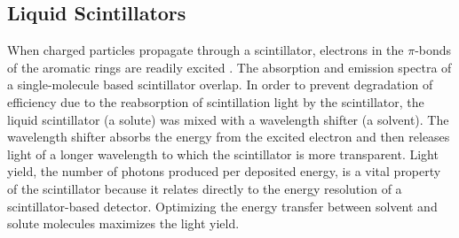 \documentclass{JINST}
\begin{document}


\subsection{Liquid Scintillators}
When charged particles propagate through a scintillator, electrons in the $\pi$-bonds of the aromatic rings are readily excited \cite{birks64}. The absorption and emission spectra of a single-molecule based scintillator overlap. In order to prevent degradation of efficiency due to the reabsorption of scintillation light by the scintillator, the liquid scintillator (a solute) was mixed with a wavelength shifter (a solvent). The wavelength shifter absorbs the energy from the excited electron and then releases light of a longer wavelength to which the scintillator is more transparent. Light yield, the number of photons produced per deposited energy, is a vital property of the scintillator because it relates directly to the energy resolution of a scintillator-based detector. Optimizing the energy transfer between solvent and solute molecules maximizes the light yield.
\end{document}
